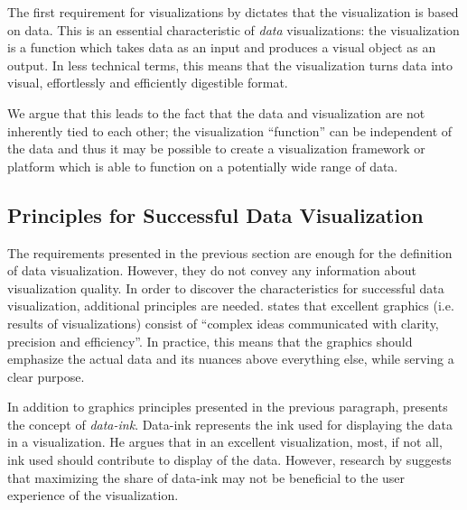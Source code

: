 The first requirement for visualizations by \citet{kosara_visualization_2007} dictates that the visualization is based on data. This is an essential characteristic of \emph{data} visualizations: the visualization is a function which takes data as an input and produces a visual object as an output. In less technical terms, this means that the visualization turns data into visual, effortlessly and efficiently digestible format.

We argue that this leads to the fact that the data and visualization are not inherently tied to each other; the visualization ``function'' can be independent of the data and thus it may be possible to create a visualization framework or platform which is able to function on a potentially wide range of data.


\subsection{Principles for Successful Data Visualization}

The requirements presented in the previous section are enough for the definition of data visualization. However, they do not convey any information about visualization quality. In order to discover the characteristics for successful data visualization, additional principles are needed. \citet[p. ~13]{tufte_visual_1986} states that excellent graphics (i.e. results of visualizations) consist of ``complex ideas communicated with clarity, precision and efficiency''. In practice, this means that the graphics should emphasize the actual data and its nuances above everything else, while serving a clear purpose.

In addition to graphics principles presented in the previous paragraph, \citet[p. ~93]{tufte_visual_1986} presents the concept of \emph{data-ink}. Data-ink represents the ink used for displaying the data in a visualization. He argues that in an excellent visualization, most, if not all, ink used should contribute to display of the data. However, research by \citet{inbar_minimalism_2007} suggests that maximizing the share of data-ink may not be beneficial to the user experience of the visualization. 


